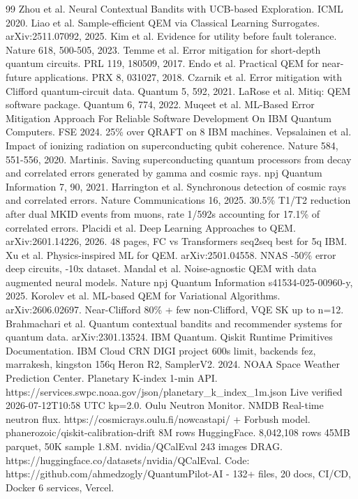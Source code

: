 \documentclass[conference]{IEEEtran}
\begin{document}
\begin{thebibliography}{99}
 Zhou et al. Neural Contextual Bandits with UCB-based Exploration. ICML 2020.
 Liao et al. Sample-efficient QEM via Classical Learning Surrogates. arXiv:2511.07092, 2025.
 Kim et al. Evidence for utility before fault tolerance. Nature 618, 500-505, 2023.
 Temme et al. Error mitigation for short-depth quantum circuits. PRL 119, 180509, 2017.
 Endo et al. Practical QEM for near-future applications. PRX 8, 031027, 2018.
 Czarnik et al. Error mitigation with Clifford quantum-circuit data. Quantum 5, 592, 2021.
 LaRose et al. Mitiq: QEM software package. Quantum 6, 774, 2022.
 Muqeet et al. ML-Based Error Mitigation Approach For Reliable Software Development On IBM Quantum Computers. FSE 2024. 25\% over QRAFT on 8 IBM machines.
 Vepsalainen et al. Impact of ionizing radiation on superconducting qubit coherence. Nature 584, 551-556, 2020.
 Martinis. Saving superconducting quantum processors from decay and correlated errors generated by gamma and cosmic rays. npj Quantum Information 7, 90, 2021.
 Harrington et al. Synchronous detection of cosmic rays and correlated errors. Nature Communications 16, 2025. 30.5\% T1/T2 reduction after dual MKID events from muons, rate 1/592s accounting for 17.1\% of correlated errors.
 Placidi et al. Deep Learning Approaches to QEM. arXiv:2601.14226, 2026. 48 pages, FC vs Transformers seq2seq best for 5q IBM.
 Xu et al. Physics-inspired ML for QEM. arXiv:2501.04558. NNAS -50\% error deep circuits, -10x dataset.
 Mandal et al. Noise-agnostic QEM with data augmented neural models. Nature npj Quantum Information s41534-025-00960-y, 2025.
 Korolev et al. ML-based QEM for Variational Algorithms. arXiv:2606.02697. Near-Clifford 80\% + few non-Clifford, VQE SK up to n=12.
 Brahmachari et al. Quantum contextual bandits and recommender systems for quantum data. arXiv:2301.13524.
 IBM Quantum. Qiskit Runtime Primitives Documentation. IBM Cloud CRN DIGI project 600s limit, backends fez, marrakesh, kingston 156q Heron R2, SamplerV2. 2024.
 NOAA Space Weather Prediction Center. Planetary K-index 1-min API. https://services.swpc.noaa.gov/json/planetary_k_index_1m.json Live verified 2026-07-12T10:58 UTC kp=2.0.
 Oulu Neutron Monitor. NMDB Real-time neutron flux. https://cosmicrays.oulu.fi/nowcastapi/ + Forbush model.
 phanerozoic/qiskit-calibration-drift 8M rows HuggingFace. 8,042,108 rows 45MB parquet, 50K sample 1.8M.
 nvidia/QCalEval 243 images DRAG. https://huggingface.co/datasets/nvidia/QCalEval.
 Code: https://github.com/ahmedzogly/QuantumPilot-AI - 132+ files, 20 docs, CI/CD, Docker 6 services, Vercel.
\end{thebibliography}
\end{document}

